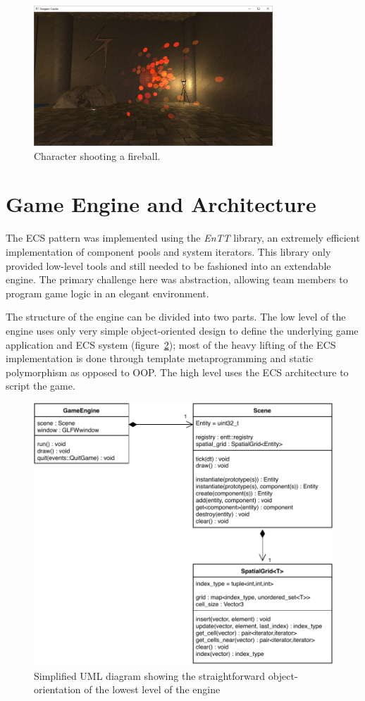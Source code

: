\documentclass[a4paper, oneside, 11pt]{report}
\begin{document}
\begin{figure}[H]
\centering
\includegraphics[width=0.8\textwidth]{fireball.PNG}
\caption{Character shooting  a fireball.}
\label{fig:fireball}
\end{figure}

\section{Game Engine and Architecture}\label{section-ecs-imp}
The ECS pattern was implemented using the \emph{EnTT} library, an extremely efficient implementation of component pools and system iterators. This library only provided low-level tools and still needed to be fashioned into an extendable engine. The primary challenge here was abstraction, allowing team members to program game logic in an elegant environment.

The structure of the engine can be divided into two parts. The low level of the engine uses only very simple object-oriented design to define the underlying game application and ECS system (figure~\ref{fig:uml}); most of the heavy lifting of the ECS implementation is done through template metaprogramming and static polymorphism as opposed to OOP. The high level uses the ECS architecture to script the game.

\begin{figure}[H]
    \centering
    \includegraphics{UML.pdf}
    \caption{Simplified UML diagram showing the straightforward object-orientation of the lowest level of the engine}
    \label{fig:uml}
\end{figure}
\end{document}
